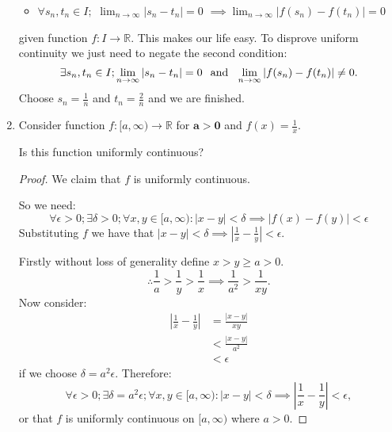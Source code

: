 \begin{enumerate}
\begin{itemize}
        \item $\forall s_n, t_n \in I;$
        $\displaystyle\lim_{n\rightarrow\infty}|s_n - t_n|=0$
        $\implies\displaystyle\lim_{n\rightarrow\infty}|f(s_n) - f(t_n)|=0$
    \end{itemize}
    given function $f:I\rightarrow\mathbb{R}$. This makes our life easy. To disprove uniform continuity we just need to negate the second condition:
    $$\exists s_n, t_n \in I; \lim_{n\rightarrow\infty}|s_n - t_n|=0
    \hspace{0.1in}\text{and}\hspace{0.1in}\lim_{n\rightarrow\infty}|f(s_n) - f(t_n)|\neq0.$$
    Choose $s_n=\frac{1}{n}$ and $t_n=\frac{2}{n}$ and we are finished.

    \newpage

    \item Consider function $f:[a,\infty)\rightarrow\mathbb{R}$
    for $\boldsymbol{a>0}$ and $f(x)=\frac{1}{x}$.

    Is this function uniformly continuous? \\

    \begin{proof}
        We claim that $f$ is uniformly continuous.
        
        So we need:
        $$\forall\epsilon>0; \exists\delta>0; \forall x, y\in [a,\infty):
        |x-y|<\delta\implies|f(x)-f(y)|<\epsilon$$
        Substituting $f$ we have that $|x-y|<\delta\implies|\frac{1}{x}-\frac{1}{y}|<\epsilon$.

        Firstly without loss of generality define $x>y\geq a>0$.
        $$\therefore \frac{1}{a}>\frac{1}{y}>\frac{1}{x}\implies
        \frac{1}{a^2}>\frac{1}{xy}.$$
        Now consider:
        \begin{align*}
            |\frac{1}{x}-\frac{1}{y}|
            &= \frac{|x-y|}{xy} \\
            &< \frac{|x-y|}{a^2} \\
            &< \epsilon
        \end{align*}
        if we choose $\delta=a^2\epsilon$. Therefore:
        $$\forall\epsilon>0; \exists\delta=a^2\epsilon; \forall x, y\in [a,\infty):
        |x-y|<\delta\implies|\frac{1}{x}-\frac{1}{y}|<\epsilon,$$
        or that $f$ is uniformly continuous on $[a,\infty)$ where $a>0$.
    \end{proof}

    \newpage


\end{enumerate}
